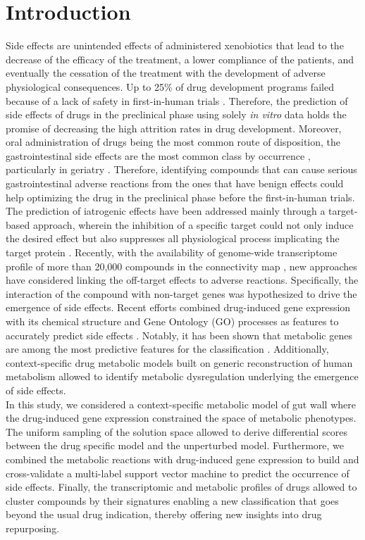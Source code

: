 \section{Introduction}
Side effects are unintended effects of administered xenobiotics that lead to the decrease of the efficacy of the treatment, a lower compliance of the patients, and eventually the cessation of the treatment with the development of adverse physiological consequences. Up to 25\% of drug development programs failed because of a lack of safety in first-in-human trials \cite{harrison2016phase}. Therefore, the prediction of side effects of drugs in the preclinical phase using solely \textit{in vitro} data holds the promise of decreasing the high attrition rates in drug development. Moreover, oral administration of drugs being the most common route of disposition, the gastrointestinal side effects are the most common class by occurrence \cite{bates1995incidence,makins2003gastrointestinal}, particularly in geriatry \cite{jain2009gastrointestinal}. Therefore, identifying compounds that can cause serious gastrointestinal adverse reactions from the ones that have benign effects could help optimizing the drug in the preclinical phase before the first-in-human trials.\\
The prediction of iatrogenic effects have been addressed mainly through a target-based approach, wherein the inhibition of a specific target could not only induce the desired effect but also suppresses all physiological process implicating the target protein \cite{campillos2008drug}. Recently, with the availability of genome-wide transcriptome profile of more than 20,000 compounds in the connectivity map \cite{subramanian2017next}, new approaches have considered linking the off-target effects to adverse reactions. Specifically, the interaction of the compound with non-target genes was hypothesized to drive the emergence of side effects. Recent efforts combined drug-induced gene expression with its chemical structure and Gene Ontology (GO) processes as features to accurately predict side effects \cite{wang2016drug}. Notably, it has been shown that metabolic genes are among the most predictive features for the classification \cite{wang2016drug}. Additionally, context-specific drug metabolic models built on generic reconstruction of human metabolism \cite{zielinski2015pharmacogenomic} allowed to identify metabolic dysregulation underlying the emergence of side effects.\\
In this study, we considered a context-specific metabolic model of gut wall where the drug-induced gene expression constrained the space of metabolic phenotypes. The uniform sampling of the solution space \cite{bordel2010sampling} allowed to derive differential scores between the drug specific model and the unperturbed model. Furthermore, we combined the metabolic reactions with drug-induced gene expression to build and cross-validate a multi-label support vector machine to predict the occurrence of side effects. Finally, the transcriptomic and metabolic profiles of drugs allowed to cluster compounds by their signatures enabling a new classification that goes beyond the usual drug indication, thereby offering new insights into drug repurposing.\\
